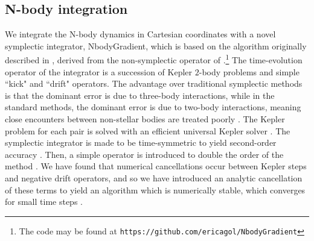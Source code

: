 \documentclass[twocolumn]{aastex63}
\begin{document}
\subsection{N-body integration}

We integrate the N-body dynamics in Cartesian coordinates with a novel symplectic
integrator, \textsf{NbodyGradient}, which is based on the algorithm originally described in \cite{Hernandez2015}, derived from the non-symplectic operator of \cite{GoncalvesFerrari2014}.\footnote{The code may be found at
    \texttt{https://github.com/ericagol/NbodyGradient}}  The time-evolution operator of the integrator is a succession of Kepler $2$-body problems and simple ``kick" and ``drift" operators.  %
The advantage over traditional symplectic methods \citep{Wisdom1991} is that the dominant error is due to three-body interactions, while in the standard methods, the dominant error is due to two-body interactions, meaning close encounters between non-stellar bodies are treated poorly \citep{Hernandez2017}.    The Kepler problem
for each pair is solved with an efficient universal Kepler solver \citep{Wisdom2015}.
The symplectic integrator is made to be time-symmetric to yield second-order
accuracy \citep{Hernandez2015}.  Then, a simple operator is introduced to double the order of the method \citep{Dehnen2017}.
We have found that numerical cancellations occur between Kepler steps
and negative drift operators, and so we have introduced an analytic cancellation
of these terms to yield an algorithm which is numerically stable,
which converges for small time steps \citep{Agol2020}.
\end{document}
